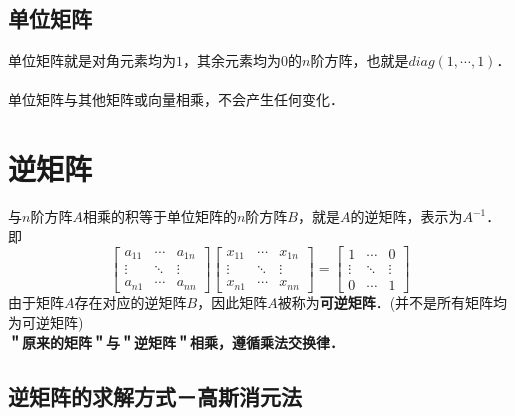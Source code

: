 \documentclass[12pt]{article}
\begin{document}
\begin{CJK}{UTF8}{gbsn}
\subsection{单位矩阵}
单位矩阵就是对角元素均为$1$，其余元素均为$0$的$n$阶方阵，也就是$diag(1,\cdots,1)$．
\paragraph{}
单位矩阵与其他矩阵或向量相乘，不会产生任何变化．

\section{逆矩阵}
与$n$阶方阵$A$相乘的积等于单位矩阵的$n$阶方阵$B$，就是$A$的逆矩阵，表示为$A^{-1}$．即
\begin{equation}
\left[
\begin{array}{ccc}
a_{11} & \cdots & a_{1n} \\
\vdots & \ddots & \vdots \\
a_{n1} & \cdots & a_{nn} 
\end{array}
\right]
\left[
\begin{array}{ccc}
x_{11} & \cdots & x_{1n} \\
\vdots & \ddots & \vdots \\
x_{n1} & \cdots & x_{nn} 
\end{array}
\right]
=
\left[
\begin{array}{ccc}
1 & \cdots & 0 \\
\vdots & \ddots & \vdots \\
0 & \cdots & 1
\end{array}
\right]
\end{equation}
由于矩阵$A$存在对应的逆矩阵$B$，因此矩阵$A$被称为\textbf{可逆矩阵}．(并不是所有矩阵均为可逆矩阵)\\
\textbf{＂原来的矩阵＂与＂逆矩阵＂相乘，遵循乘法交换律．}
\subsection{逆矩阵的求解方式－高斯消元法}

\end{CJK}
\end{document}
